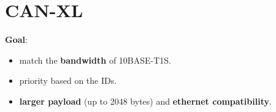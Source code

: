\section{CAN-XL}
\textbf{Goal}:
\begin{itemize}[nosep]
    \item match the \textbf{bandwidth} of 10BASE-T1S.
    \item priority based on the IDs.
    \item \textbf{larger payload} (up to 2048 bytes) and \textbf{ethernet compatibility}.
\end{itemize}